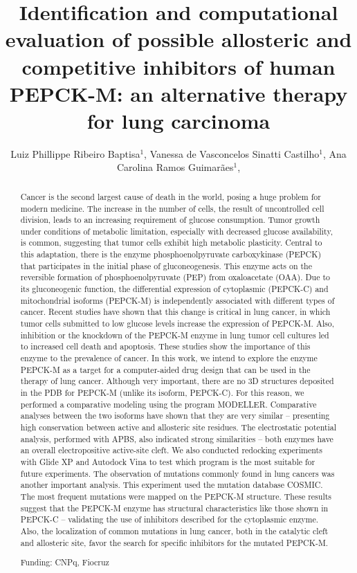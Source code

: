 \documentclass[twoside]{article}
\title{\vspace{-15mm}\fontsize{24pt}{10pt}\selectfont\textbf{ Identification and computational evaluation of possible allosteric and competitive inhibitors of human PEPCK-M: an alternative therapy for lung carcinoma }} %
\author{ Luiz Phillippe Ribeiro Baptisa$^{1}$, Vanessa de Vasconcelos Sinatti Castilho$^{1}$, Ana Carolina Ramos Guimarães$^{1}$, }
\affil{ 1 FIOCRUZ-IOC

 }
\date{}
\begin{document}
  
  
  \maketitle %
  
  
  \thispagestyle{fancy} %
  
  
  \begin{abstract}
  Cancer is the second largest cause of death in the world, posing a huge problem for modern medicine. The increase in the number of cells, the result of uncontrolled cell division, leads to an increasing requirement of glucose consumption. Tumor growth under conditions of metabolic limitation, especially with decreased glucose availability, is common, suggesting that tumor cells exhibit high metabolic plasticity. Central to this adaptation, there is the enzyme phosphoenolpyruvate carboxykinase (PEPCK) that participates in the initial phase of gluconeogenesis. This enzyme acts on the reversible formation of phosphoenolpyruvate (PEP) from oxaloacetate (OAA). Due to its gluconeogenic function, the differential expression of cytoplasmic (PEPCK-C) and mitochondrial isoforms (PEPCK-M) is independently associated with different types of cancer. Recent studies have shown that this change is critical in lung cancer, in which tumor cells submitted to low glucose levels increase the expression of PEPCK-M. Also, inhibition or the knockdown of the PEPCK-M enzyme in lung tumor cell cultures led to increased cell death and apoptosis. These studies show the importance of this enzyme to the prevalence of cancer. In this work, we intend to explore the enzyme PEPCK-M as a target for a computer-aided drug design that can be used in the therapy of lung cancer. Although very important, there are no 3D structures deposited in the PDB for PEPCK-M (unlike its isoform, PEPCK-C). For this reason, we performed a comparative modeling using the program MODELLER. Comparative analyses between the two isoforms have shown that they are very similar – presenting high conservation between active and allosteric site residues. The electrostatic potential analysis, performed with APBS, also indicated strong similarities – both enzymes have an overall electropositive active-site cleft. We also conducted redocking experiments with Glide XP and Autodock Vina to test which program is the most suitable for future experiments. The observation of mutations commonly found in lung cancers was another important analysis. This experiment used the mutation database COSMIC. The most frequent mutations were mapped on the PEPCK-M structure. These results suggest that the PEPCK-M enzyme has structural characteristics like those shown in PEPCK-C – validating the use of inhibitors described for the cytoplasmic enzyme. Also, the localization of common mutations in lung cancer, both in the catalytic cleft and allosteric site, favor the search for specific inhibitors for the mutated PEPCK-M.
  
  Funding: CNPq, Fiocruz \\ 
  \end{abstract}
  
\end{document}
